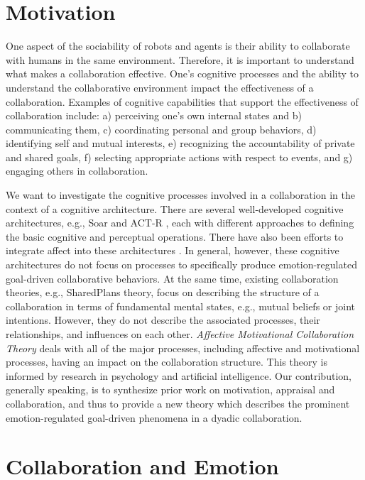 \documentclass[letterpaper]{article}
\begin{document}
\section{Motivation}

One aspect of the sociability of robots and agents is their ability to
collaborate with humans in the same environment. Therefore, it is important to
understand what makes a collaboration effective. One's cognitive processes and
the ability to understand the collaborative environment impact the effectiveness
of a collaboration. Examples of cognitive capabilities that support the
effectiveness of collaboration include: a) perceiving one's own internal states
and b) communicating them, c) coordinating personal and group behaviors, d)
identifying self and mutual interests, e) recognizing the accountability of
private and shared goals, f) selecting appropriate actions with respect to
events, and g) engaging others in collaboration.

We want to investigate the cognitive processes involved in a collaboration in
the context of a cognitive architecture. There are several well-developed
cognitive architectures, e.g., Soar \cite{laird:soar} and ACT-R
\cite{anderson:act-r}, each with different approaches to defining the basic
cognitive and perceptual operations. There have also been efforts to integrate
affect into these architectures
\cite{dancy:actR-physiology-affect,marinier:behavior-emotion}. In general,
however, these cognitive architectures do not focus on processes to specifically
produce emotion-regulated goal-driven collaborative behaviors. At the same time,
existing collaboration theories, e.g., SharedPlans \cite{grosz:plans-discourse}
theory, focus on describing the structure of a collaboration in terms of
fundamental mental states, e.g., mutual beliefs or joint intentions. However,
they do not describe the associated processes, their relationships, and
influences on each other. \textit{Affective Motivational Collaboration Theory}
deals with all of the major processes, including affective and motivational
processes, having an impact on the collaboration structure. This theory is
informed by research in psychology and artificial intelligence. Our
contribution, generally speaking, is to synthesize prior work on motivation,
appraisal and collaboration, and thus to provide a new theory which describes
the prominent emotion-regulated goal-driven phenomena in a dyadic collaboration.

\section{Collaboration and Emotion}
\end{document}

